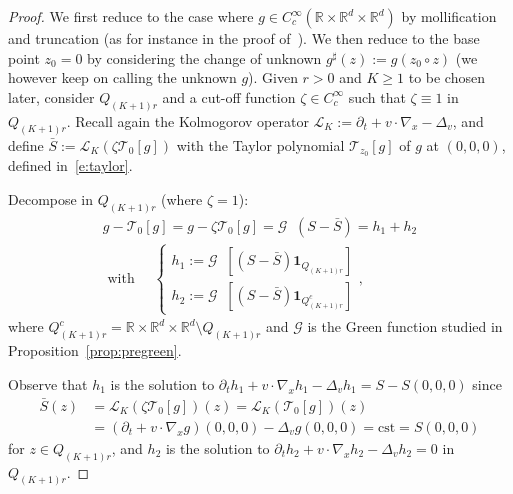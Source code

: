 \documentclass[AHL,Unicode,longabstracts,published]{cedram}
\DeclareMathOperator{\starkin}{\star_{\, kin}}
\newcommand{\R}{\mathbb{R}}
\newcommand{\cL}{\mathcal{L}}
\newcommand{\cT}{\mathcal{T}}
\newcommand{\cG}{\mathcal{G}}
\newcommand*\un{\mathbf{1}}
\begin{document}
\begin{proof}
We first reduce to the case where $g \in C^\infty_c (\R \times \R^d \times \R^d)$ by mollification and truncation (as for instance in the proof of~\cite[Lemma~8.7.1, p.~122]{krylov1996}). We then reduce to the base point $z_0=0$ by considering the change of unknown $g^\sharp(z) := g(z_0 \circ z)$ (we however keep on calling the unknown $g$). Given $r>0$ and $K \ge 1$ to be chosen later, consider $Q_{(K+1)r}$ and a cut-off function $\zeta \in C^\infty_c$ such that $\zeta \equiv 1$ in $Q_{(K+1)r}$. Recall again the Kolmogorov operator $\cL_K := \partial_t + v \cdot \nabla_x - \Delta_v$, and define $\bar S := \cL_K (\zeta \cT_{0}[g])$ with the Taylor polynomial $\cT_{z_0}[g]$ of $g$ at $(0,0,0)$, defined in~\eqref{e:taylor}.

Decompose in $Q_{(K+1)r}$ (where $\zeta =1$):
\begin{multline*}
g - \cT_{0}[g] = g - \zeta
\cT_{0}[g] = \cG \starkin (S -\bar S) = h_1 + h_2
\\
\text{ with } \quad
\begin{cases} h_1 := \cG \starkin \left[(S- \bar S)
\un_{Q_{(K+1)r}} \right]
 \\[2mm] h_2 := \cG \starkin \left[(S-\bar S) \un_{Q^c_{(K+1)r}} \right]
\end{cases},
\end{multline*}
where $Q^c_{(K+1)r} = \R \times \R^d \times \R^d \setminus Q_{(K+1)r}$ and $\cG$ is the Green function studied in Proposition~\ref{prop:pregreen}.

Observe that $h_1$ is the solution to $\partial_t h_1 + v \cdot \nabla_x h_1 -\Delta_v h_1 = S-S(0,0,0)$ since
\begin{align*}
\bar S(z) &= \cL_K(\zeta \cT_0[g])(z) = \cL_K(\cT_0[g])(z) \\
&= \left(\partial_t + v \cdot \nabla_x g\right)(0,0,0) - \Delta_v g(0,0,0) = \text{cst} = S(0,0,0)
\end{align*}
for $z \in Q_{(K+1)r}$, and $h_2$ is the solution to $\partial_t h_2 + v \cdot \nabla_x h_2- \Delta_v h_2 = 0$ in $Q_{(K+1)r}$.


\end{proof}
\end{document}
